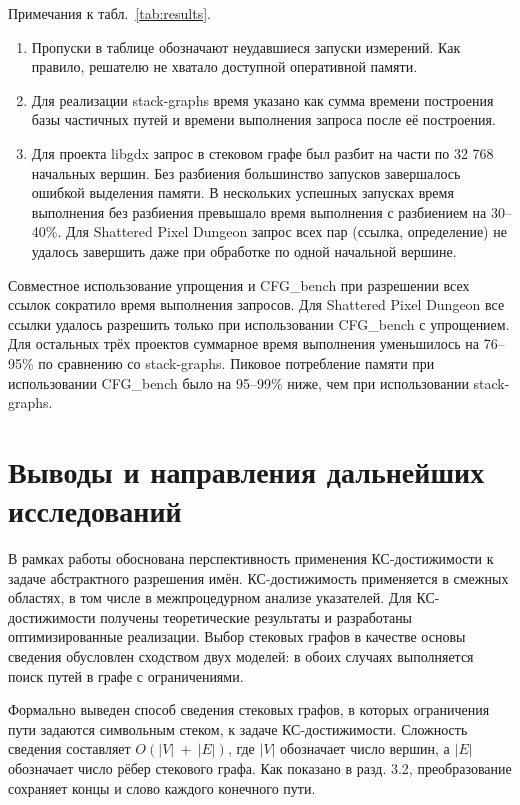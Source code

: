 Примечания к табл.~\ref{tab:results}.

\begin{enumerate}
\def\labelenumi{\arabic{enumi}.}
\item
  Пропуски в таблице обозначают неудавшиеся запуски измерений. Как правило, решателю не хватало доступной оперативной памяти.
\item
  Для реализации stack-graphs время указано как сумма времени построения базы частичных путей и времени выполнения запроса после её построения.
\item
  Для проекта libgdx запрос в стековом графе был разбит на части по 32 768 начальных вершин. Без разбиения большинство запусков завершалось ошибкой выделения памяти. В нескольких успешных запусках время выполнения без разбиения превышало время выполнения с разбиением на 30--40\%. Для Shattered Pixel Dungeon запрос всех пар (ссылка, определение) не удалось завершить даже при обработке по одной начальной вершине.
\end{enumerate}

Совместное использование упрощения и CFG\_bench при разрешении всех ссылок сократило время выполнения запросов. Для Shattered Pixel Dungeon все ссылки удалось разрешить только при использовании CFG\_bench с упрощением. Для остальных трёх проектов суммарное время выполнения уменьшилось на 76--95\% по сравнению со stack-graphs. Пиковое потребление памяти при использовании CFG\_bench было на 95--99\% ниже, чем при использовании stack-graphs.

\section{Выводы и направления дальнейших исследований}\label{sec:conclusion}

В рамках работы обоснована перспективность применения КС-достижимости к задаче абстрактного разрешения имён. КС-достижимость применяется в смежных областях, в том числе в межпроцедурном анализе указателей. Для КС-достижимости получены теоретические результаты и разработаны оптимизированные реализации. Выбор стековых графов в качестве основы сведения обусловлен сходством двух моделей: в обоих случаях выполняется поиск путей в графе с ограничениями.

Формально выведен способ сведения стековых графов, в которых ограничения пути задаются символьным стеком, к задаче КС-достижимости. Сложность сведения составляет \(O(|V|\  + \ |E|)\), где \(|V|\) обозначает число вершин, а \(|E|\) обозначает число рёбер стекового графа. Как показано в разд. 3.2, преобразование сохраняет концы и слово каждого конечного пути.

